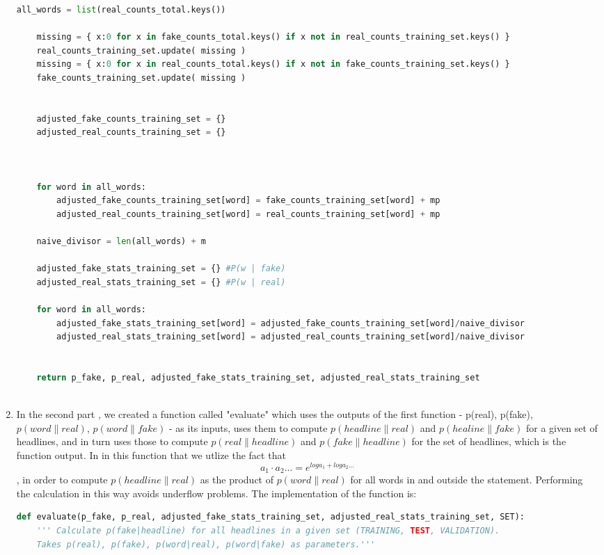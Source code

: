 \documentclass{article}
\begin{document}
\begin{enumerate}
\begin{lstlisting}[language=Python]
    all_words = list(real_counts_total.keys())
    
    missing = { x:0 for x in fake_counts_total.keys() if x not in real_counts_training_set.keys() }
    real_counts_training_set.update( missing )
    missing = { x:0 for x in real_counts_total.keys() if x not in fake_counts_training_set.keys() }
    fake_counts_training_set.update( missing )
    
    
    adjusted_fake_counts_training_set = {} 
    adjusted_real_counts_training_set = {} 
    
    
    
    for word in all_words:
        adjusted_fake_counts_training_set[word] = fake_counts_training_set[word] + mp
        adjusted_real_counts_training_set[word] = real_counts_training_set[word] + mp
        
    naive_divisor = len(all_words) + m

    adjusted_fake_stats_training_set = {} #P(w | fake)
    adjusted_real_stats_training_set = {} #P(w | real)
    
    for word in all_words:
        adjusted_fake_stats_training_set[word] = adjusted_fake_counts_training_set[word]/naive_divisor
        adjusted_real_stats_training_set[word] = adjusted_real_counts_training_set[word]/naive_divisor
    

    return p_fake, p_real, adjusted_fake_stats_training_set, adjusted_real_stats_training_set 
    
   \end{lstlisting}


\item 
In the second part , we created a function called "evaluate" which uses the outputs of the first function -  p(real), p(fake), $p(word\|real)$, $p(word\|fake)$ - as its inputs, uses them to compute $p(headline\|real)$ and $p(healine\|fake)$ for a given
set of headlines, and in turn uses those to compute $p(real\|headline)$ and $p(fake\|headline)$ for the set of headlines, which is the function output. In in this function that we utlize the fact that \begin{equation}a_1 \cdot a_2 ...=  e^{log{a_1} + log{a_2} ...} \end{equation}, in order to compute 
$p(headline\|real)$ as the product of $p(word\|real)$ for all words in and outside the statement. Performing the calculation in this way avoids underflow problems.
The implementation of the function is:
\begin{lstlisting}[language=Python]
def evaluate(p_fake, p_real, adjusted_fake_stats_training_set, adjusted_real_stats_training_set, SET):
    ''' Calculate p(fake|headline) for all headlines in a given set (TRAINING, TEST, VALIDATION).
    Takes p(real), p(fake), p(word|real), p(word|fake) as parameters.'''


\end{lstlisting}
\end{enumerate}
\end{document}
